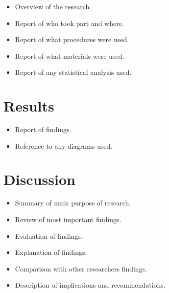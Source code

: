 \documentclass{sig-alternate}
\begin{document}
\begin{itemize}
	\item Overview of the research.
	\item Report of who took part and where.
	\item Report of what procedures were used.
	\item Report of what materials were used.
	\item Report of any statistical analysis used.
\end{itemize}


\section{Results} %
\label{sec:results}
\begin{itemize}
	\item Report of findings.
	\item Reference to any diagrams used.
\end{itemize}

\section{Discussion} %
\label{sec:discussion}
\begin{itemize}
	\item Summary of main purpose of research.
	\item Review of most important findings.
	\item Evaluation of findings.
	\item Explanation of findings.
	\item Comparison with other researchers findings.
	\item Description of implications and recommendations.
\end{itemize}




%
%
\end{document}
